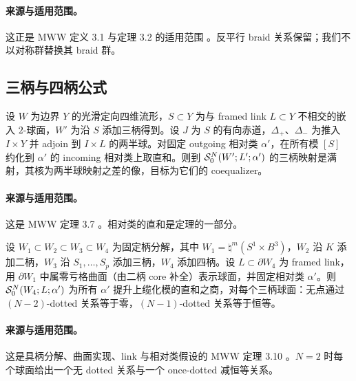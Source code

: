 \paragraph{来源与适用范围。}
这正是 MWW 定义 3.1 与定理 3.2 的适用范围 \cite[Definition~3.1 and Theorem~3.2]{ManolescuWalkerWedrich2023}。反平行 braid 关系保留；我们不以对称群替换其 braid 群。

\subsection{三柄与四柄公式}

\begin{externalresult}[MWW 定理 3.7]\label{prop:mww-3.7}
设 $W$ 为边界 $Y$ 的光滑定向四维流形，$S\subset Y$ 为与 framed link $L\subset Y$ 不相交的嵌入 $2$-球面，$W'$ 为沿 $S$ 添加三柄得到。设 $J$ 为 $S$ 的有向赤道，$\Delta_+$、$\Delta_-$ 为推入 $I\times Y$ 并 adjoin 到 $I\times L$ 的两半球。对固定 outgoing 相对类 $\alpha'$，在所有模 $[S]$ 约化到 $\alpha'$ 的 incoming 相对类上取直和。则到 $\mathcal{S}^{N}_{0}(W';L';\alpha')$ 的三柄映射是满射，其核为两半球映射之差的像，目标为它们的 coequalizer。
\end{externalresult}

\paragraph{来源与适用范围。}
这是 MWW 定理 3.7 \cite[Theorem~3.7]{ManolescuWalkerWedrich2023}。相对类的直和是定理的一部分。

\begin{externalresult}[MWW 定理 3.10]\label{prop:mww-3.10}
设 $W_1\subset W_2\subset W_3\subset W_4$ 为固定柄分解，其中 $W_1=\natural^m(S^1\times B^3)$，$W_2$ 沿 $K$ 添加二柄，$W_3$ 沿 $S_1,\ldots,S_p$ 添加三柄，$W_4$ 添加四柄。设 $L\subset\partial W_4$ 为 framed link，用 $\partial W_1$ 中属零亏格曲面（由二柄 core 补全）表示球面，并固定相对类 $\alpha'$。则 $\mathcal{S}^{N}_{0}(W_4;L;\alpha')$ 为所有 $\alpha'$ 提升上缆化模的直和之商，对每个三柄球面：无点通过 $(N-2)$-dotted 关系等于零，$(N-1)$-dotted 关系等于恒等。
\end{externalresult}

\paragraph{来源与适用范围。}
这是具柄分解、曲面实现、link 与相对类假设的 MWW 定理 3.10 \cite[Theorem~3.10]{ManolescuWalkerWedrich2023}。$N=2$ 时每个球面给出一个无 dotted 关系与一个 once-dotted 减恒等关系。

